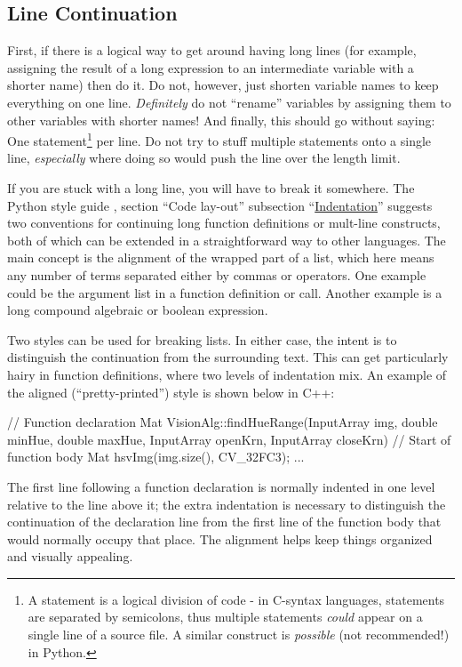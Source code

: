 \documentclass[12pt]{article}
\begin{document}
\subsection{Line Continuation}
\label{sec:line-cont}
First, if there is a logical way to get around having long lines (for example, assigning the result of a long expression to an intermediate variable with a shorter name) then do it. Do not, however, just shorten variable names to keep everything on one line. \emph{Definitely} do not ``rename'' variables by assigning them to other variables with shorter names! And finally, this should go without saying: One statement\footnote{A statement is a logical division of code - in C-syntax languages, statements are separated by semicolons, thus multiple statements \emph{could} appear on a single line of a source file. A similar construct is \emph{possible} (not recommended!) in Python.} per line. Do not try to stuff multiple statements onto a single line, \emph{especially} where doing so would push the line over the length limit.

If you are stuck with a long line, you will have to break it somewhere. The Python style guide \cite{pyguide}, section ``Code lay-out'' subsection ``\href{http://www.python.org/dev/peps/pep-0008/#indentation}{Indentation}'' suggests two conventions for continuing long function definitions or mult-line constructs, both of which can be extended in a straightforward way to other languages. The main concept is the alignment of the wrapped part of a list, which here means any number of terms separated either by commas or operators. One example could be the argument list in a function definition or call. Another example is a long compound algebraic or boolean expression.

Two styles can be used for breaking lists. In either case, the intent is to distinguish the continuation from the surrounding text. This can get particularly hairy in function definitions, where two levels of indentation mix. An example of the aligned (``pretty-printed'') style is shown below in C++:
\begin{codeex}
// Function declaration
Mat VisionAlg::findHueRange(InputArray img, double minHue, double maxHue,
                            InputArray openKrn, InputArray closeKrn) {
    // Start of function body
    Mat hsvImg(img.size(), CV_32FC3);
    ...
}
\end{codeex}
The first line following a function declaration is normally indented in one level relative to the line above it; the extra indentation is necessary to distinguish the continuation of the declaration line from the first line of the function body that would normally occupy that place. The alignment helps keep things organized and visually appealing.
\end{document}
